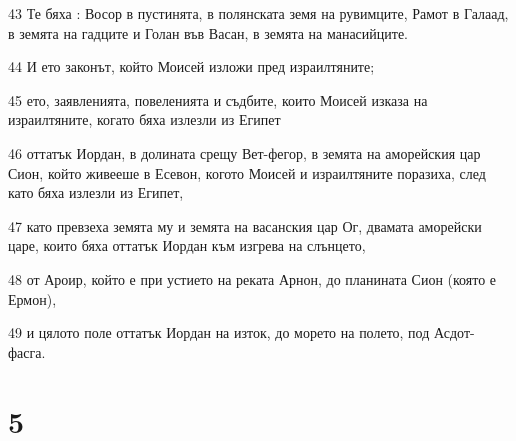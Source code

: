\par 43 Те бяха : Восор в пустинята, в полянската земя на рувимците, Рамот в Галаад, в земята на гадците и Голан във Васан, в земята на манасийците.
\par 44 И ето законът, който Моисей изложи пред израилтяните;
\par 45 ето, заявленията, повеленията и съдбите, които Моисей изказа на израилтяните, когато бяха излезли из Египет
\par 46 оттатък Иордан, в долината срещу Вет-фегор, в земята на аморейския цар Сион, който живееше в Есевон, когото Моисей и израилтяните поразиха, след като бяха излезли из Египет,
\par 47 като превзеха земята му и земята на васанския цар Ог, двамата аморейски царе, които бяха оттатък Иордан към изгрева на слънцето,
\par 48 от Ароир, който е при устието на реката Арнон, до планината Сион (която е Ермон),
\par 49 и цялото поле оттатък Иордан на изток, до морето на полето, под Асдот-фасга.

\chapter{5}

